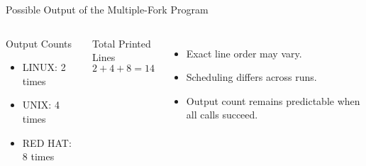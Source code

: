 \documentclass[aspectratio=169]{beamer}
\begin{document}
\begin{frame}{Possible Output of the Multiple-Fork Program}

\begin{columns}


\begin{block}{Output Counts}
\begin{itemize}
    \item LINUX: 2 times
    \item UNIX: 4 times
    \item RED HAT: 8 times
\end{itemize}
\end{block}


\begin{block}{Total Printed Lines}
\[
2+4+8=14
\]
\end{block}

\begin{itemize}
    \item Exact line order may vary.
    \item Scheduling differs across runs.
    \item Output count remains predictable when all calls succeed.
\end{itemize}

\end{columns}

\end{frame}
\end{document}
